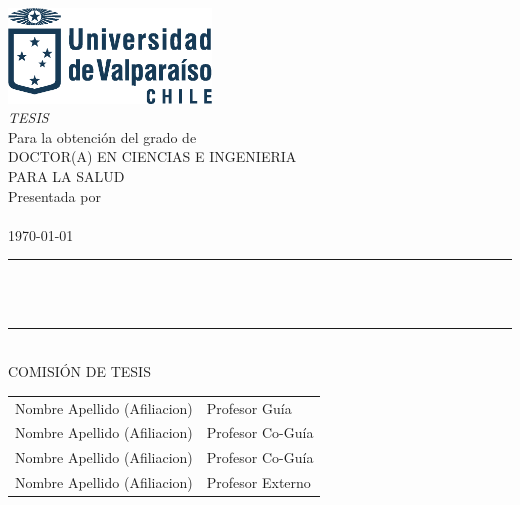 
\begin{titlepage}
    \rmfamily\large %
    \centering 
    \includegraphics[width=5.4cm,keepaspectratio]{elements/logos/logoUVazul.eps}\\
    \vspace{2\baselineskip}
    \textit{\uppercase{Tesis}} \\ [2ex]
    Para la obtención del grado de \\ [2ex]
    \uppercase{Doctor(a) en Ciencias e Ingenieria \\ Para la Salud} \\ [2ex]
    Presentada por \\ [1.5ex]
    \uppercase{\TesisAuthor} \\ [2ex]
    \today \\
    \vspace{1\baselineskip}
    \rule{0.35\textwidth}{0.5pt} \\
    \vspace{1\baselineskip}
    {%
    \rmfamily\LARGE\bfseries %
    \TesisTitle
    }\\
    \vspace{1\baselineskip}
    \rule{0.35\textwidth}{0.5pt}
    \vspace{3\baselineskip} \\
    \uppercase{Comisión de Tesis} \\ [2ex] 
    \begin{tabular}{l@{\hskip 2cm}l}
        Nombre Apellido (Afiliacion) & Profesor Guía \\[10pt]
        Nombre Apellido (Afiliacion) & Profesor Co-Guía \\ [10pt]
        Nombre Apellido (Afiliacion) & Profesor Co-Guía \\ [10pt]
        Nombre Apellido (Afiliacion) & Profesor Externo \\ [10pt]
    \end{tabular}
    \vfill
\end{titlepage}